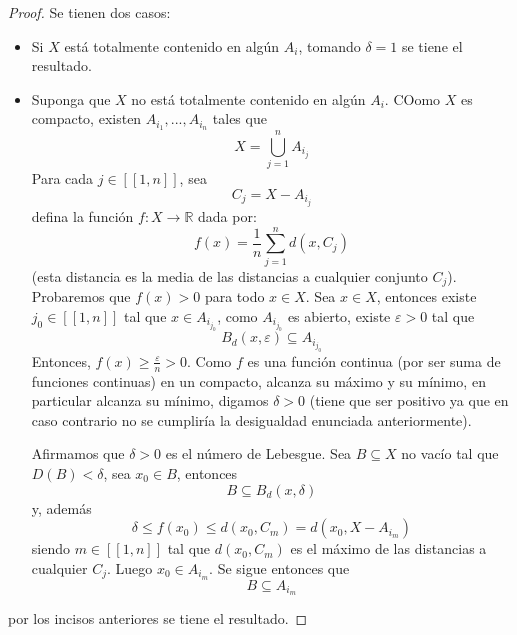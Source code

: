 \documentclass[12pt]{report}
\theoremstyle{largebreak}
\newcommand\cf[3]{\ensuremath{#1:#2\rightarrow#3}}
\newcommand\natint[1]{\ensuremath{\left[\!\left[ #1\right]\!\right]}}
\begin{document}
    \begin{proof}
        Se tienen dos casos:
        \begin{itemize}
            \item Si $X$ está totalmente contenido en algún $A_i$, tomando $\delta=1$ se tiene el resultado.
            \item Suponga que $X$ no está totalmente contenido en algún $A_i$. COomo $X$ es compacto, existen $A_{ i_1},...,A_{ i_n}$ tales que
            \begin{equation*}
                X=\bigcup_{ j=1}^n A_{ i_j}
            \end{equation*}
            Para cada $j\in\natint{1,n}$, sea
            \begin{equation*}
                C_j=X-A_{ i_j}
            \end{equation*}
            defina la función $\cf{f}{X}{\mathbb{R}}$ dada por:
            \begin{equation*}
                f(x)=\frac{1}{n}\sum_{ j=1}^n d(x,C_j)
            \end{equation*}
            (esta distancia es la media de las distancias a cualquier conjunto $C_j$). Probaremos que $f(x)>0$ para todo $x\in X$. Sea $x\in X$, entonces existe $j_0\in\natint{1,n}$ tal que $x\in A_{ i_{ j_0}}$, como $A_{ i_{ j_0}}$ es abierto, existe $\varepsilon>0$ tal que
            \begin{equation*}
                B_d(x,\varepsilon)\subseteq A_{ i_{ j_0}}
            \end{equation*}
            Entonces, $f(x)\geq\frac{\varepsilon}{n}>0$. Como $f$ es una función continua (por ser suma de funciones continuas) en un compacto, alcanza su máximo y su mínimo, en particular alcanza su mínimo, digamos $\delta>0$ (tiene que ser positivo ya que en caso contrario no se cumpliría la desigualdad enunciada anteriormente).

            Afirmamos que $\delta>0$ es el número de Lebesgue. Sea $B\subseteq X$ no vacío tal que $D(B)<\delta$, sea $x_0\in B$, entonces
            \begin{equation*}
                B\subseteq B_d(x,\delta)
            \end{equation*}
            y, además
            \begin{equation*}
                \delta\leq f(x_0)\leq d(x_0,C_m)=d(x_0,X-A_{ i_m})
            \end{equation*}
            siendo $m\in\natint{1,n}$ tal que $d(x_0,C_m)$ es el máximo de las distancias a cualquier $C_j$. Luego $x_0\in A_{ i_m}$. Se sigue entonces que
            \begin{equation*}
                B\subseteq A_{ i_m}
            \end{equation*}
        \end{itemize}
        por los incisos anteriores se tiene el resultado.
    \end{proof}
\end{document}
